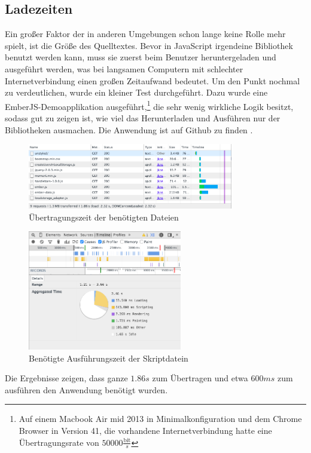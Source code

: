 \documentclass[12pt,twoside]{book}
\begin{document}
\subsection{Ladezeiten}\label{sec:loadingtimes}

Ein großer Faktor der in anderen Umgebungen schon lange keine Rolle mehr spielt, ist die Größe des Quelltextes. Bevor in JavaScript irgendeine Bibliothek benutzt werden kann, muss sie zuerst beim Benutzer heruntergeladen und ausgeführt werden, was bei langsamen Computern mit schlechter Internetverbindung einen großen Zeitaufwand bedeutet. Um den Punkt nochmal zu verdeutlichen, wurde ein kleiner Test durchgeführt. Dazu wurde eine EmberJS-Demoapplikation ausgeführt,\footnote{Auf einem Macbook Air mid 2013 in Minimalkonfiguration und dem Chrome Browser in Version 41, die vorhandene Internetverbindung hatte eine Übertragungsrate von $50000 \frac{\text{bit}}{s}$} die sehr wenig wirkliche Logik besitzt, sodass gut zu zeigen ist, wie viel das Herunterladen und Ausführen nur der Bibliotheken ausmachen.
Die Anwendung ist auf Github zu finden \cite{embercrud}.
\begin{figure}[htbp]
    \centering
    \includegraphics[width=0.8\textwidth]{images/performance_1.png}
    \caption{Übertragungszeit der benötigten Dateien}
    \label{fig:loadtimes}
\end{figure}
\begin{figure}[htbp]
    \centering
    \includegraphics[width=0.6\textwidth]{images/performance_2.png}
    \caption{Benötigte Ausführungszeit der Skriptdatein}
    \label{fig:executiontime}
\end{figure}
Die Ergebnisse zeigen, dass ganze $1.86s$ zum Übertragen und etwa $600ms$ zum ausführen den Anwendung benötigt wurden.
\end{document}
